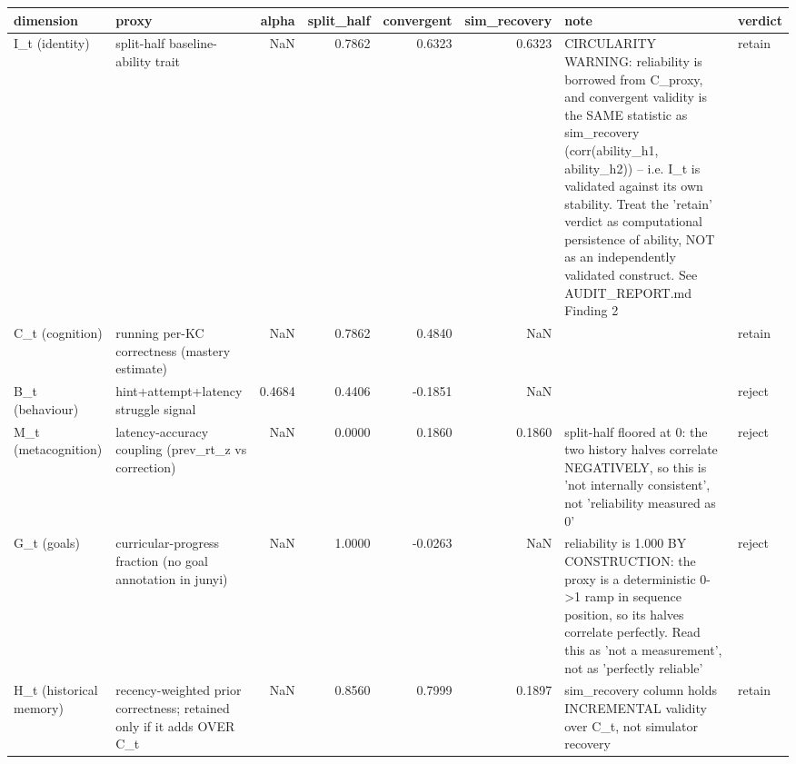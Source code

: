 \begin{tabular}{llrrrrll}
\toprule
dimension & proxy & alpha & split\_half & convergent & sim\_recovery & note & verdict \\
\midrule
I\_t (identity) & split-half baseline-ability trait & NaN & 0.7862 & 0.6323 & 0.6323 & CIRCULARITY WARNING: reliability is borrowed from C\_proxy, and convergent validity is the SAME statistic as sim\_recovery (corr(ability\_h1, ability\_h2)) -- i.e. I\_t is validated against its own stability. Treat the 'retain' verdict as computational persistence of ability, NOT as an independently validated construct. See AUDIT\_REPORT.md Finding 2 & retain \\
C\_t (cognition) & running per-KC correctness (mastery estimate) & NaN & 0.7862 & 0.4840 & NaN &  & retain \\
B\_t (behaviour) & hint+attempt+latency struggle signal & 0.4684 & 0.4406 & -0.1851 & NaN &  & reject \\
M\_t (metacognition) & latency-accuracy coupling (prev\_rt\_z vs correction) & NaN & 0.0000 & 0.1860 & 0.1860 & split-half floored at 0: the two history halves correlate NEGATIVELY, so this is 'not internally consistent', not 'reliability measured as 0' & reject \\
G\_t (goals) & curricular-progress fraction (no goal annotation in junyi) & NaN & 1.0000 & -0.0263 & NaN & reliability is 1.000 BY CONSTRUCTION: the proxy is a deterministic 0->1 ramp in sequence position, so its halves correlate perfectly. Read this as 'not a measurement', not as 'perfectly reliable' & reject \\
H\_t (historical memory) & recency-weighted prior correctness; retained only if it adds OVER C\_t & NaN & 0.8560 & 0.7999 & 0.1897 & sim\_recovery column holds INCREMENTAL validity over C\_t, not simulator recovery & retain \\
\bottomrule
\end{tabular}
